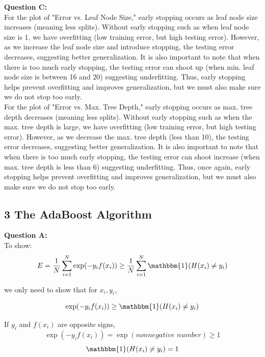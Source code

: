 \documentclass[12 pt]{article}
\begin{document}
	
	\noindent\textbf{Question C:}  \\
	\noindent For the plot of "Error vs. Leaf Node Size," early stopping occurs as leaf node size increases (meaning less splits).  Without early stopping such as when leaf node size is 1, we have overfitting (low training error, but high testing error). However, as we increase the leaf node size and introduce stopping, the testing error decreases, suggesting better generalization. It is also important to note that when there is too much early stopping, the testing error can shoot up (when min. leaf node size is between 16 and 20) suggesting underfitting. Thus, early stopping helps prevent overfitting and improves generalization, but we must also make sure we do not stop too early. \\
	
	\noindent For the plot of "Error vs. Max. Tree Depth," early stopping occurs as max. tree depth decreases (meaning less splits).  Without early stopping such as when the max. tree depth is large, we have overfitting (low training error, but high testing error). However, as we decrease the max. tree depth (less than 10), the testing error decreases, suggesting better generalization. It is also important to note that when there is too much early stopping, the testing error can shoot increase (when max. tree depth is less than 6) suggesting underfitting. Thus, once again, early stopping helps prevent overfitting and improves generalization, but we must also make sure we do not stop too early. \\
	
	\subsection*{3 The AdaBoost Algorithm}
	\noindent\textbf{Question A:} \\
	To show:
	\[ E = \frac{1}{N} \sum_{i = 1}^N \exp(-y_i f(x_i)) \geq \frac{1}{N} \sum_{i = 1}^N
	\mathbbm{1} (H(x_i) \neq y_i) \]
	
	we only need to show that for $x_i, y_i$,
	
	\[ \exp(-y_i f(x_i)) \geq \mathbbm{1} (H(x_i) \neq y_i) \]
	

	If $y_i$ and $f(x_i)$ are opposite signs, 
	\[ \exp(-y_i f(x_i)) = \exp(\textit{nonnegative number}) \geq 1 \]
	\[ \mathbbm{1} (H(x_i) \neq y_i) = 1 \]
	
\end{document}
